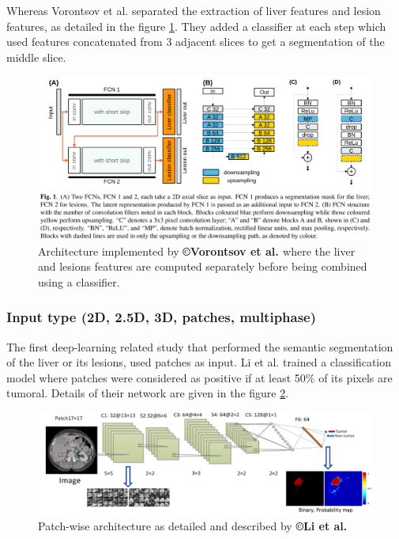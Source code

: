 Whereas Vorontsov et al. \cite{Vorontsov2018} separated the extraction of liver
features and lesion features, as detailed in the figure \ref{Vorontsov2018_Fig1}. They
added a classifier at each step which used features concatenated from 3
adjacent slices to get a segmentation of the middle slice.

\begin{figure}[th!]
	\centering
	\includegraphics[width=0.7\linewidth]{images/image17}
	\caption{Architecture implemented by \textbf{©Vorontsov et al. \cite{Vorontsov2018}} where the liver and lesions features are computed separately before being combined using a classifier.}
	\label{Vorontsov2018_Fig1}
\end{figure}


\subsubsection{Input type (2D, 2.5D, 3D, patches, multiphase)}

The first deep-learning related study that performed the semantic
segmentation of the liver or its lesions, used patches as input.
Li et al. \cite{Li2015} trained a classification model where patches were
considered as positive if at least 50\% of its pixels are tumoral.
Details of their network are given in the figure \ref{Li2015_Patch_fig}.

\begin{figure}[th!]
	\centering
	\includegraphics[width=0.7\linewidth]{images/image2}
	\caption{Patch-wise architecture as detailed and described by \textbf{©Li et al. \cite{Li2015}}}
	\label{Li2015_Patch_fig}
\end{figure}


